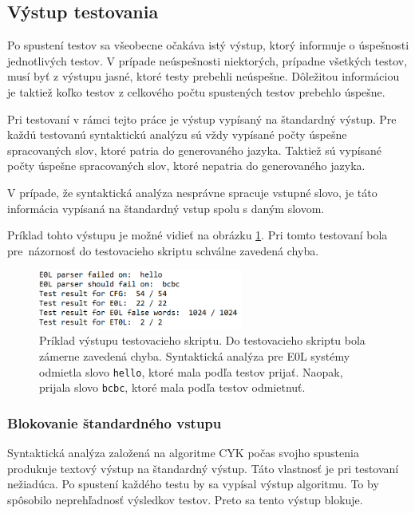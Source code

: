 \subsection*{Výstup testovania}
Po spustení testov sa všeobecne očakáva istý výstup, ktorý informuje o úspešnosti jednotlivých testov. V prípade neúspešnosti niektorých, prípadne všetkých testov, musí byť z výstupu jasné, ktoré testy prebehli neúspešne. Dôležitou informáciou je taktiež koľko testov z celkového počtu spustených testov prebehlo úspešne.

Pri testovaní v rámci tejto práce je výstup vypísaný na štandardný výstup. Pre každú testovanú syntaktickú analýzu sú vždy vypísané počty úspešne spracovaných slov, ktoré patria do generovaného jazyka. Taktiež sú vypísané počty úspešne spracovaných slov, ktoré nepatria do generovaného jazyka.

V prípade, že syntaktická analýza nesprávne spracuje vstupné slovo, je táto informácia vypísaná na štandardný vstup spolu s daným slovom.

Príklad tohto výstupu je možné vidieť na obrázku \ref{testOutput}. Pri tomto testovaní bola pre~názornosť do testovacieho skriptu schválne zavedená chyba.

\begin{figure}[hbt]
	\centering
	\includegraphics[width=0.6\textwidth]{obrazky-figures/testOutput.png}
	\caption{Príklad výstupu testovacieho skriptu. Do testovacieho skriptu bola zámerne zavedená chyba. Syntaktická analýza pre E0L systémy odmietla slovo \texttt{hello}, ktoré mala podľa testov prijať. Naopak, prijala slovo \texttt{bcbc}, ktoré mala podľa testov odmietnuť.}
	\label{testOutput}
\end{figure}

\subsubsection*{Blokovanie štandardného vstupu}
Syntaktická analýza založená na algoritme CYK počas svojho spustenia produkuje textový výstup na štandardný výstup. Táto vlastnosť je pri testovaní nežiadúca. Po spustení každého testu by sa vypísal výstup algoritmu. To by spôsobilo neprehľadnosť výsledkov testov. Preto sa tento výstup blokuje.

